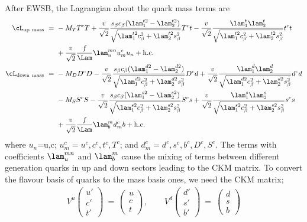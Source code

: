 After EWSB, the Lagrangian about the quark mass terms are 
\begin{align}
  \cL_{\rm{up~mass}}~=~& -M_T T^c T + \frac{v}{\sqrt{2}} \frac{s_\beta c_\beta (\lam_1^{t2}-\lam_2^{t2})}{\sqrt{\lam_1^{t2} c_\beta^2 + \lam_2^{t2}s_\beta^2}}T^c t
         - \frac{v}{\sqrt{2}} \frac{\lam_1^t \lam_2^t}{\sqrt{\lam_1^{t2} c_\beta^2 + \lam_2^{t2} s_\beta^2}}t^c t \nonumber\\
         &+\frac{v}{\sqrt{2}}\frac{f}{\Lam}\lam_u^{mn}u_m^c u_n + {\rm{h.c.}} \label{eq:massLagup}\\
 \cL_{\rm{down~mass}}~=~& -M_D D^c D - \frac{v}{\sqrt{2}} \frac{s_\beta c_\beta (\lam_1^{d2}-\lam_2^{d2})}{\sqrt{\lam_1^{d2} c_\beta^2 + \lam_2^{d2}s_\beta^2}}D^c d
         + \frac{v}{\sqrt{2}} \frac{\lam_1^d \lam_2^d}{\sqrt{\lam_1^{d2} c_\beta^2 + \lam_2^{d2} s_\beta^2}} d^c d \nonumber\\
                        & -M_S S^c S - \frac{v}{\sqrt{2}} \frac{s_\beta c_\beta (\lam_1^{s2}-\lam_2^{s2})}{\sqrt{\lam_1^{s2} c_\beta^2 + \lam_2^{s2}s_\beta^2}}S^c s
         + \frac{v}{\sqrt{2}} \frac{\lam_1^s \lam_2^s}{\sqrt{\lam_1^{s2} c_\beta^2 + \lam_2^{s2} s_\beta^2}} s^c s \nonumber\\
         & +\frac{v}{\sqrt{2}}\frac{f}{\Lam}\lam_b^{m} d_m^c b + {\rm{h.c.}} \label{eq:massLagdown}
\end{align}
 where $u_n$=u,c; $u_m^c=u^c,c^c,t^c,T^c$; and $d_m^c=d^c,s^c,b^c,D^c,S^c$.
The terms with coefficients $\lam_u^{mn}$ and $\lam_b^m$ cause the mixing of terms between different generation quarks in up and down sectors leading to the CKM matrix. 
To convert the flavour basis of quarks to the mass basis ones, we need the CKM matrix;
\begin{align}
  V^u \left( \begin{array}{c}  u'\\  c' \\  t' \end{array}\right) ~=~\left( \begin{array}{c}  u \\  c \\  t \end{array}\right), ~~~~~~~~~
  V^d \left( \begin{array}{c}  d'\\  s' \\  b' \end{array}\right) ~=~\left( \begin{array}{c}  d \\  s \\  b \end{array}\right) 
\end{align}
